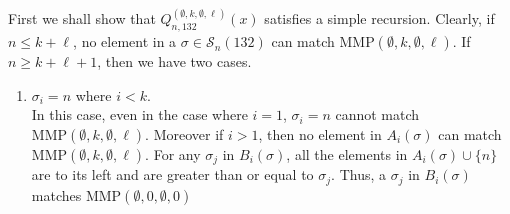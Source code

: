 \documentclass[
final,nomarks
]{dmtcs-episciences}
\newcommand{\Sn}[1]{\mathcal{S}_{#1}}
\newcommand{\Qmmn}[2]{Q_{#2,132}^{(#1)}(x)}
\newcommand{\MMP}{\mathrm{MMP}}
\begin{document}
First we shall show that \begin{math}\Qmmn{\emptyset,k,\emptyset,\ell}{n}\end{math} satisfies a simple recursion. 
Clearly, if \begin{math}n \leq k+ \ell\end{math}, no element in a \begin{math}\sigma \in \Sn{n}(132)\end{math} can match 
\begin{math}\MMP(\emptyset,k,\emptyset,\ell)\end{math}. If \begin{math}n \geq k + \ell +1\end{math}, then we 
have two cases. 
\begin{enumerate}[{\bf Case }\bf 1.]
	\item \begin{math}\sigma_i =n\end{math} where \begin{math}i < k\end{math}.  \\
	In this case, even in the case where \begin{math}i =1\end{math}, \begin{math}\sigma_i =n\end{math} cannot match
	\begin{math}\MMP(\emptyset,k,\emptyset,\ell)\end{math}.  Moreover if 
	\begin{math}i > 1\end{math}, then no element in \begin{math}A_i(\sigma)\end{math} can match \begin{math}\MMP(\emptyset,k,\emptyset,\ell)\end{math}. 
	For any \begin{math}\sigma_j\end{math} in \begin{math}B_i(\sigma)\end{math}, all the elements in \begin{math}A_i(\sigma) \cup \{n\}\end{math} are to its 
	left and are greater than or equal to \begin{math}\sigma_j\end{math}. 
	Thus, a \begin{math}\sigma_j\end{math} in \begin{math}B_i(\sigma)\end{math} matches \begin{math}\MMP(\emptyset,0,\emptyset,0)\end{math} 

\end{enumerate}
\end{document}
